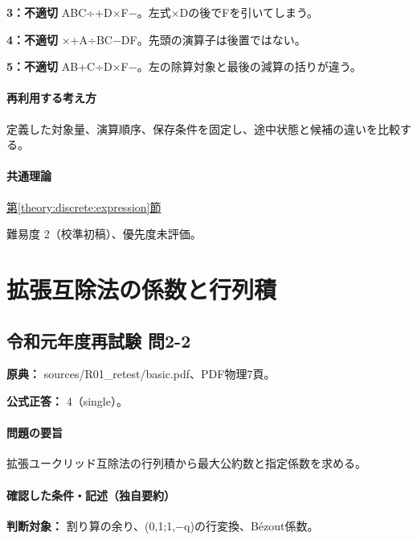 \noindent\textbf{3：不適切} ABC÷+D×F−。左式×Dの後でFを引いてしまう。\par

\noindent\textbf{4：不適切} ×+A÷BC−DF。先頭の演算子は後置ではない。\par

\noindent\textbf{5：不適切} AB+C÷D×F−。左の除算対象と最後の減算の括りが違う。\par

\paragraph{再利用する考え方} 定義した対象量、演算順序、保存条件を固定し、途中状態と候補の違いを比較する。

\paragraph{共通理論} \hyperref[theory:discrete:expression]{第\ref*{theory:discrete:expression}節}

\par 難易度 2（校準初稿）、優先度未評価。

\section{拡張互除法の係数と行列積}

\subsection{令和元年度再試験 問2-2}
\label{q:r01-ret-basic-2-2}

\noindent\textbf{原典：} sources/R01\_retest/basic.pdf、PDF物理7頁。

\textbf{公式正答：} 4（single）。

\paragraph{問題の要旨} 拡張ユークリッド互除法の行列積から最大公約数と指定係数を求める。

\paragraph{確認した条件・記述（独自要約）}\mbox{}\par

\noindent\textbf{判断対象：} 割り算の余り、(0,1;1,−q)の行変換、Bézout係数。\par

